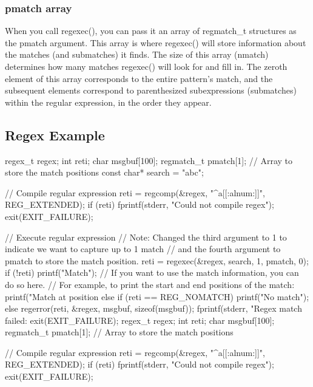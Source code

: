 \documentclass{report}
\begin{document}
    \subsubsection{pmatch array}
    \bigbreak \noindent 
    When you call regexec(), you can pass it an array of regmatch\_t structures as the pmatch argument. This array is where regexec() will store information about the matches (and submatches) it finds. The size of this array (nmatch) determines how many matches regexec() will look for and fill in. The zeroth element of this array corresponds to the entire pattern's match, and the subsequent elements correspond to parenthesized subexpressions (submatches) within the regular expression, in the order they appear.

    \bigbreak \noindent 
    \subsection{Regex Example}
    \bigbreak \noindent 
    \begin{cppcode}
        regex_t regex;
        int reti;
        char msgbuf[100];
        regmatch_t pmatch[1]; // Array to store the match positions
        const char* search = "abc";

        // Compile regular expression
        reti = regcomp(&regex, "^a[[:alnum:]]", REG_EXTENDED);
        if (reti) {
            fprintf(stderr, "Could not compile regex\n");
            exit(EXIT_FAILURE);
        }

        // Execute regular expression
        // Note: Changed the third argument to 1 to indicate we want to capture up to 1 match
        // and the fourth argument to pmatch to store the match position.
        reti = regexec(&regex, search, 1, pmatch, 0);
        if (!reti) {
            printf("Match\n");
            // If you want to use the match information, you can do so here.
            // For example, to print the start and end positions of the match:
            printf("Match at position %
        }
        else if (reti == REG_NOMATCH) {
            printf("No match\n");
        }
        else {
            regerror(reti, &regex, msgbuf, sizeof(msgbuf));
            fprintf(stderr, "Regex match failed: %
            exit(EXIT_FAILURE);
        }regex_t regex;
    int reti;
    char msgbuf[100];
    regmatch_t pmatch[1]; // Array to store the match positions

    // Compile regular expression
    reti = regcomp(&regex, "^a[[:alnum:]]", REG_EXTENDED);
    if (reti) {
        fprintf(stderr, "Could not compile regex\n");
        exit(EXIT_FAILURE);
    }
    \end{cppcode}
\end{document}
